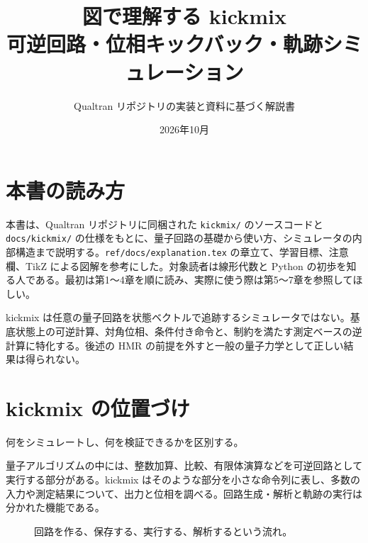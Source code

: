 \documentclass[a4paper,11pt,oneside,openany]{ltjsbook}
\title{図で理解する kickmix\\[.5em]\large 可逆回路・位相キックバック・軌跡シミュレーション}
\author{Qualtran リポジトリの実装と資料に基づく解説書}
\date{2026年10月}
\newcommand{\code}[1]{\nolinkurl{#1}}
\begin{document}
\frontmatter\maketitle
\chapter*{本書の読み方}
本書は、Qualtran リポジトリに同梱された \code{kickmix/} のソースコードと \code{docs/kickmix/} の仕様をもとに、量子回路の基礎から使い方、シミュレータの内部構造まで説明する。\code{ref/docs/explanation.tex} の章立て、学習目標、注意欄、TikZ による図解を参考にした。対象読者は線形代数と Python の初歩を知る人である。最初は第1〜4章を順に読み、実際に使う際は第5〜7章を参照してほしい。

\begin{notice}
kickmix は任意の量子回路を状態ベクトルで追跡するシミュレータではない。基底状態上の可逆計算、対角位相、条件付き命令と、制約を満たす測定ベースの逆計算に特化する。後述の HMR の前提を外すと一般の量子力学として正しい結果は得られない。
\end{notice}
\tableofcontents
\mainmatter
\chapter{kickmix の位置づけ}
\begin{goal}何をシミュレートし、何を検証できるかを区別する。\end{goal}
量子アルゴリズムの中には、整数加算、比較、有限体演算などを可逆回路として実行する部分がある。kickmix はそのような部分を小さな命令列に表し、多数の入力や測定結果について、出力と位相を調べる。回路生成・解析と軌跡の実行は分かれた機能である。
\begin{figure}[htbp]\centering
{}\caption{回路を作る、保存する、実行する、解析するという流れ。}\end{figure}
\end{document}
